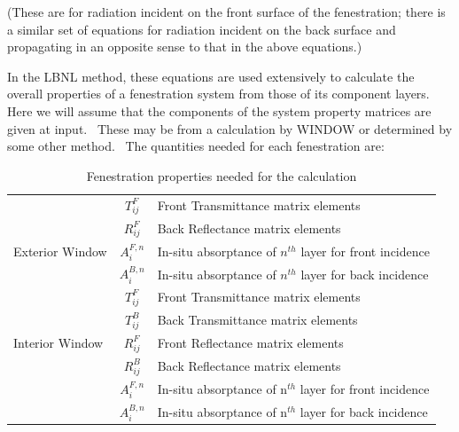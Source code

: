 (These are for radiation incident on the front surface of the fenestration; there is a similar set of equations for radiation incident on the back surface and propagating in an opposite sense to that in the above equations.)

In the LBNL method, these equations are used extensively to calculate the overall properties of a fenestration system from those of its component layers.~ Here we will assume that the components of the system property matrices are given at input.~ These may be from a calculation by WINDOW or determined by some other method.~ The quantities needed for each fenestration are:

\begin{table}
\caption{Fenestration properties needed for the calculation}
\centering
\begin{tabular} { | l | c | l | }
\hline
 & $T_{ij}^F$ & Front Transmittance matrix elements \\
 & $R_{ij}^F$ & Back Reflectance matrix elements \\
Exterior Window & $A_i^{F,n}$ & In-situ absorptance of $n^{th}$ layer for front incidence \\
 & $A_i^{B,n}$ & In-situ absorptance of $n^{th}$ layer for back incidence \\
\hline
 & $T_{ij}^F$ & Front Transmittance matrix elements \\
 & $T_{ij}^B$ & Back Transmittance matrix elements \\
Interior Window & $R_{ij}^F$ & Front Reflectance matrix elements \\
 & $R_{ij}^B$ & Back Reflectance matrix elements \\
 & $A_i^{F,n}$ & In-situ absorptance of n\(^{th}\) layer for front incidence \\
 & $A_i^{B,n}$ & In-situ absorptance of n\(^{th}\) layer for back incidence \\
\hline
\end{tabular}
\end{table}

